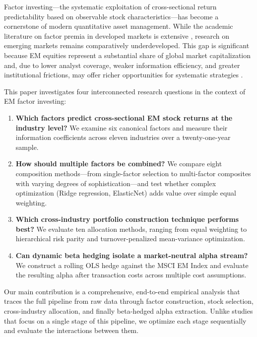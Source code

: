 \documentclass[12pt,a4paper]{article}
\begin{document}
Factor investing---the systematic exploitation of cross-sectional return predictability based on observable stock characteristics---has become a cornerstone of modern quantitative asset management. While the academic literature on factor premia in developed markets is extensive \citep{famafrench1993, famafrench2015, carhart1997}, research on emerging markets remains comparatively underdeveloped. This gap is significant because EM equities represent a substantial share of global market capitalization and, due to lower analyst coverage, weaker information efficiency, and greater institutional frictions, may offer richer opportunities for systematic strategies \citep{cakici2013, hanauer2015}.

This paper investigates four interconnected research questions in the context of EM factor investing:

\begin{enumerate}
    \item \textbf{Which factors predict cross-sectional EM stock returns at the industry level?} We examine six canonical factors and measure their information coefficients across eleven industries over a twenty-one-year sample.

    \item \textbf{How should multiple factors be combined?} We compare eight composition methods---from single-factor selection to multi-factor composites with varying degrees of sophistication---and test whether complex optimization (Ridge regression, ElasticNet) adds value over simple equal weighting.

    \item \textbf{Which cross-industry portfolio construction technique performs best?} We evaluate ten allocation methods, ranging from equal weighting to hierarchical risk parity and turnover-penalized mean-variance optimization.

    \item \textbf{Can dynamic beta hedging isolate a market-neutral alpha stream?} We construct a rolling OLS hedge against the MSCI EM Index and evaluate the resulting alpha after transaction costs across multiple cost assumptions.
\end{enumerate}

Our main contribution is a comprehensive, end-to-end empirical analysis that traces the full pipeline from raw data through factor construction, stock selection, cross-industry allocation, and finally beta-hedged alpha extraction. Unlike studies that focus on a single stage of this pipeline, we optimize each stage sequentially and evaluate the interactions between them.
\end{document}
